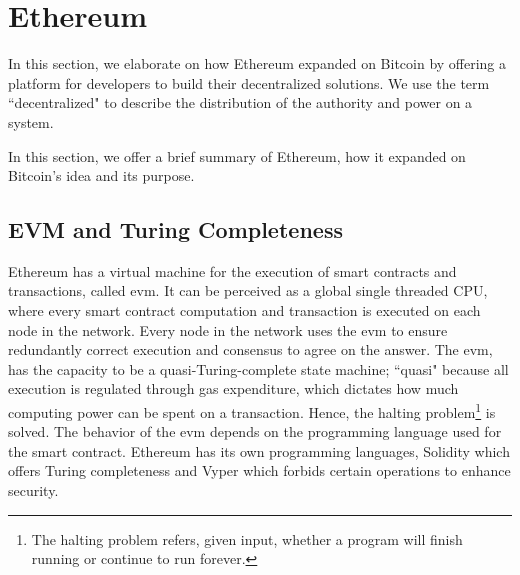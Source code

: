 \section{Ethereum}
In this section, we elaborate on how Ethereum expanded on Bitcoin by offering a platform for developers to build their decentralized solutions. We use the term ``decentralized" to describe the distribution of the authority and power on a system. 

In this section, we offer a brief summary of Ethereum, how it expanded on Bitcoin's idea and its purpose. 

\subsection{EVM and Turing Completeness}
Ethereum has a virtual machine for the execution of smart contracts and transactions, called \acrfull{evm}. It can be perceived as a global single threaded CPU, where every smart contract computation and transaction is executed on each node in the network. Every node in the network uses the \acrshort{evm} to ensure redundantly correct execution and consensus to agree on the answer. The \acrshort{evm}, has the capacity to be a quasi-Turing-complete state machine; ``quasi" because all execution is regulated through gas expenditure, which dictates how much computing power can be spent on a transaction. Hence, the halting problem\footnote{The halting problem refers, given input, whether a program will finish running or continue to run forever.} is solved. The behavior of the \acrshort{evm} depends on the programming language used for the smart contract. Ethereum has its own programming languages, Solidity which offers Turing completeness and Vyper which forbids certain operations to enhance security.

